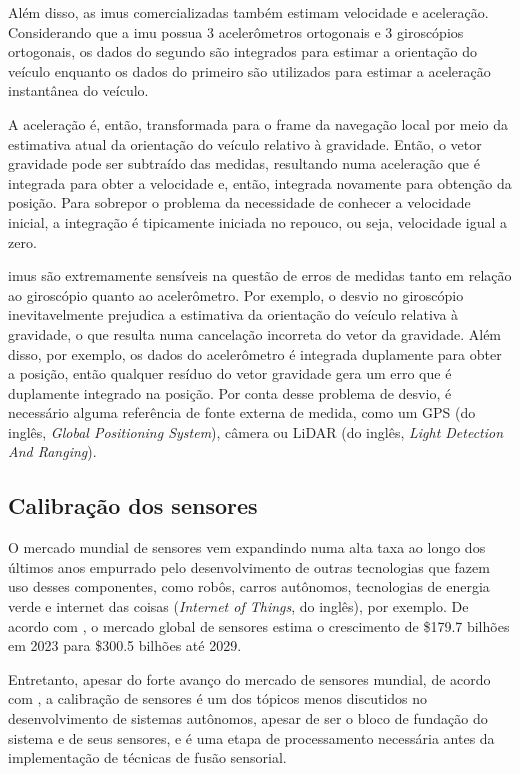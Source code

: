 \documentclass[acronym, symbols, table]{fei}
\begin{document}
				Além disso, as \acrshort{imu}s comercializadas também estimam velocidade e aceleração. Considerando que a \acrshort{imu} possua 3 acelerômetros ortogonais e 3 giroscópios ortogonais, os dados do segundo são integrados para estimar a orientação do veículo enquanto os dados do primeiro são utilizados para estimar a aceleração instantânea do veículo.
				
				A aceleração é, então, transformada para o frame da navegação local por meio da estimativa atual da orientação do veículo relativo à gravidade. Então, o vetor gravidade pode ser subtraído das medidas, resultando numa aceleração que é integrada para obter a velocidade e, então, integrada novamente para obtenção da posição. Para sobrepor o problema da necessidade de conhecer a velocidade inicial, a integração é tipicamente iniciada no repouco, ou seja, velocidade igual a zero.
				
				\acrshort{imu}s são extremamente sensíveis na questão de erros de medidas tanto em relação ao giroscópio quanto ao acelerômetro. Por exemplo, o desvio no giroscópio inevitavelmente prejudica a estimativa da orientação do veículo relativa à gravidade, o que resulta numa cancelação incorreta do vetor da gravidade. Além disso, por exemplo, os dados do acelerômetro é integrada duplamente para obter a posição, então qualquer resíduo do vetor gravidade gera um erro que é duplamente integrado na posição. Por conta desse problema de desvio, é necessário alguma referência de fonte externa de medida, como um GPS (do inglês, \textit{Global Positioning System}), câmera ou LiDAR (do inglês, \textit{Light Detection And Ranging}).
		
		\subsection{Calibração dos sensores}
		
		O mercado mundial de sensores vem expandindo numa alta taxa ao longo dos últimos anos empurrado pelo desenvolvimento de outras tecnologias que fazem uso desses componentes, como robôs, carros autônomos, tecnologias de energia verde e internet das coisas (\textit{Internet of Things}, do inglês), por exemplo. De acordo com \textcite{sensor_market}, o mercado global de sensores estima o crescimento de \$179.7 bilhões em 2023 para \$300.5 bilhões até 2029.
		
		Entretanto, apesar do forte avanço do mercado de sensores mundial, de acordo com \textcite{calibration_av}, a calibração de sensores é um dos tópicos menos discutidos no desenvolvimento de sistemas autônomos, apesar de ser o bloco de fundação do sistema e de seus sensores, e é uma etapa de processamento necessária antes da implementação de técnicas de fusão sensorial.
		
\end{document}
